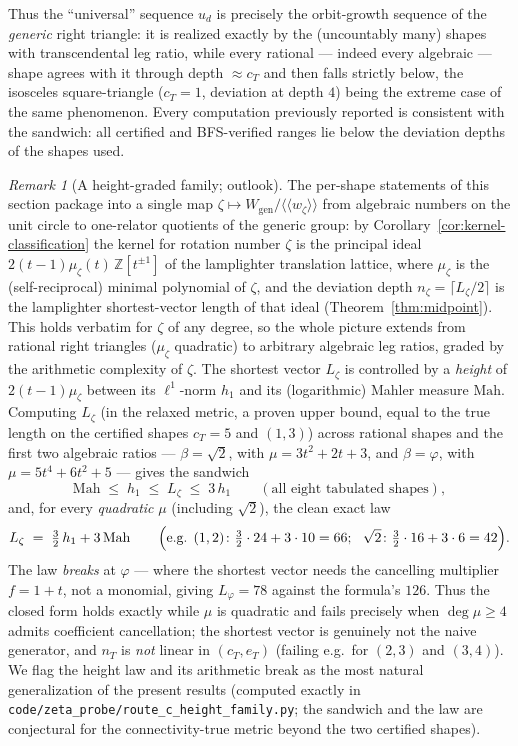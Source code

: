 \documentclass[11pt,a4paper]{article}
\theoremstyle{remark}
\newtheorem{remark}[theorem]{Remark}
\theoremstyle{plain}
\begin{document}
Thus the ``universal'' sequence $u_d$ is precisely the orbit-growth
sequence of the \emph{generic} right triangle: it is realized exactly
by the (uncountably many) shapes with transcendental leg ratio, while
every rational --- indeed every algebraic --- shape agrees with it
through depth $\approx c_T$ and then falls strictly below, the
isosceles square-triangle ($c_T = 1$, deviation at depth $4$) being the
extreme case of the same phenomenon.  Every computation previously
reported is consistent with the sandwich: all certified and BFS-verified
ranges lie below the deviation depths of the shapes used.

\begin{remark}[A height-graded family; outlook]
\label{rem:height-family}
The per-shape statements of this section package into a single map
$\zeta \mapsto W_{\mathrm{gen}} / \langle\!\langle w_\zeta
\rangle\!\rangle$ from algebraic numbers on the unit circle to one-relator
quotients of the generic group: by
Corollary~\ref{cor:kernel-classification} the kernel for rotation number
$\zeta$ is the principal ideal $2(t-1)\mu_\zeta(t)\,\mathbb{Z}[t^{\pm 1}]$
of the lamplighter translation lattice, where $\mu_\zeta$ is the
(self-reciprocal) minimal polynomial of $\zeta$, and the deviation depth
$n_\zeta = \lceil L_\zeta / 2\rceil$ is the lamplighter shortest-vector
length of that ideal (Theorem~\ref{thm:midpoint}).  This holds verbatim
for $\zeta$ of any degree, so the whole picture extends from rational
right triangles ($\mu_\zeta$ quadratic) to arbitrary algebraic leg
ratios, graded by the arithmetic complexity of $\zeta$.  The shortest
vector $L_\zeta$ is controlled by a \emph{height} of $2(t-1)\mu_\zeta$
between its $\ell^1$-norm $h_1$ and its (logarithmic) Mahler measure
$\mathrm{Mah}$.  Computing $L_\zeta$ (in the relaxed metric, a proven
upper bound, equal to the true length on the certified shapes $c_T = 5$
and $(1,3)$) across rational shapes and the first two algebraic ratios
--- $\beta = \sqrt 2$, with $\mu = 3t^2 + 2t + 3$, and $\beta = \varphi$,
with $\mu = 5t^4 + 6t^2 + 5$ --- gives the sandwich
\[
\mathrm{Mah} \;\le\; h_1 \;\le\; L_\zeta \;\le\; 3\,h_1
\qquad(\text{all eight tabulated shapes}),
\]
and, for every \emph{quadratic} $\mu$ (including $\sqrt 2$), the clean
exact law
\[
L_\zeta \;=\; \tfrac{3}{2}\, h_1 + 3\,\mathrm{Mah}
\qquad\Bigl(\text{e.g. } (1,2)\colon \tfrac32\cdot 24 + 3\cdot 10 = 66;\ \
\sqrt 2\colon \tfrac32\cdot 16 + 3\cdot 6 = 42\Bigr).
\]
\noindent The law \emph{breaks} at $\varphi$ --- where the shortest vector
needs the cancelling multiplier $f = 1+t$, not a monomial, giving
$L_\varphi = 78$ against the formula's $126$.  Thus the closed form holds
exactly while $\mu$ is quadratic and fails precisely when $\deg \mu \ge 4$
admits coefficient cancellation; the shortest vector is genuinely not the
naive generator, and $n_T$ is \emph{not} linear in $(c_T, e_T)$ (failing
e.g.\ for $(2,3)$ and $(3,4)$).  We flag the height law and its
arithmetic break as the most natural generalization of the present
results (computed exactly in \texttt{code/zeta\_probe/route\_c\_height\_family.py};
the sandwich and the law are conjectural for the connectivity-true
metric beyond the two certified shapes).
\end{remark}
\end{document}
